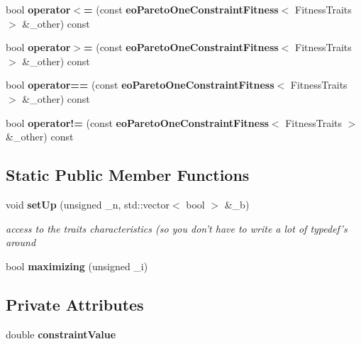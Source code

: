 \begin{CompactItemize}
\item 
bool {\bf operator$<$=} (const {\bf eo\-Pareto\-One\-Constraint\-Fitness}$<$ Fitness\-Traits $>$ \&\_\-other) const \label{classeo_pareto_one_constraint_fitness_a10}

\item 
bool {\bf operator$>$=} (const {\bf eo\-Pareto\-One\-Constraint\-Fitness}$<$ Fitness\-Traits $>$ \&\_\-other) const \label{classeo_pareto_one_constraint_fitness_a11}

\item 
bool {\bf operator==} (const {\bf eo\-Pareto\-One\-Constraint\-Fitness}$<$ Fitness\-Traits $>$ \&\_\-other) const \label{classeo_pareto_one_constraint_fitness_a12}

\item 
bool {\bf operator!=} (const {\bf eo\-Pareto\-One\-Constraint\-Fitness}$<$ Fitness\-Traits $>$ \&\_\-other) const \label{classeo_pareto_one_constraint_fitness_a13}

\end{CompactItemize}
\subsection*{Static Public Member Functions}
\begin{CompactItemize}
\item 
void {\bf set\-Up} (unsigned \_\-n, std::vector$<$ bool $>$ \&\_\-b)\label{classeo_pareto_one_constraint_fitness_e0}

\begin{CompactList}\small\item\em access to the traits characteristics (so you don't have to write a lot of typedef's around \item\end{CompactList}\item 
bool {\bf maximizing} (unsigned \_\-i)\label{classeo_pareto_one_constraint_fitness_e1}

\end{CompactItemize}
\subsection*{Private Attributes}
\begin{CompactItemize}
\item 
double {\bf constraint\-Value}\label{classeo_pareto_one_constraint_fitness_r0}

\end{CompactItemize}



